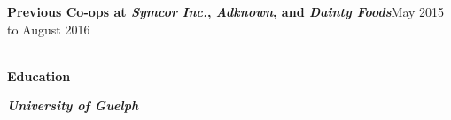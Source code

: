 \documentclass[9pt]{extarticle}
\begin{document}
{    \textbf{{\firamedium Previous Co-ops at \textit{Symcor Inc.}, \textit{Adknown}, and \textit{Dainty Foods}}}{\color{darkgrey}\hfill{\small{May 2015 to August 2016 \\[-3pt]}}
    }
    {\color{lightgrey}{\centerline{\rule{17cm}{0.4pt}}}}
    \begin{LARGE}
        \color{em-light}\textbf{\\[-5pt]{\firamedium Education}\\[-8pt]}
    \end{LARGE}

    \textit{\textbf{{\firamedium University of Guelph}}}{}
}
\end{document}
